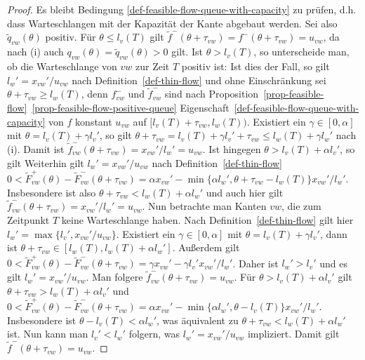 \begin{proof}
	Es bleibt Bedingung \ref{def-feasible-flow-queue-with-capacity} zu prüfen, d.h. dass Warteschlangen mit der Kapazität der Kante abgebaut werden.
	Sei also $\tilde{q}_{vw}(\theta)$ positiv.
	Für $\theta\leq l_v(T)$ gilt $\tilde{f}^-(\theta + \tau_{vw}) = f^-(\theta + \tau_{vw}) = u_{vw}$, da nach (i) auch $q_{vw}(\theta)=\tilde{q}_{vw}(\theta)>0$ gilt.
	Ist $\theta > l_v(T)$, so unterscheide man, ob die Warteschlange von $vw$ zur Zeit $T$ positiv ist:
	Ist dies der Fall, so gilt $l_w' = x_{vw}' / u_{vw}$ nach Definition~\ref{def-thin-flow} und ohne Einschränkung sei $\theta + \tau_{vw} \geq l_w(T)$, denn $f_{vw}^-$ und $\tilde{f}_{vw}^-$ sind nach Proposition~\ref{prop-feasible-flow}~\ref{prop-feasible-flow-positive-queue}  Eigenschaft~\ref{def-feasible-flow-queue-with-capacity} von $f$ konstant $u_{vw}$ auf $[l_v(T)+\tau_{vw},l_w(T))$.
	Existiert ein $\gamma\in [0, \alpha]$ mit $\theta = l_v(T) + \gamma l_v'$, so gilt $\theta + \tau_{vw} = l_v(T) + \gamma l_v' + \tau_{vw} \leq l_w(T) + \gamma l_w'$ nach (i).
	Damit ist $\tilde{f}^-_{vw}(\theta + \tau_{vw}) = x_{vw}'/l_w' = u_{vw}$.
	Ist  hingegen $\theta > l_v(T) + \alpha l_v'$, so gilt
	Weiterhin gilt $l_w' = x_{vw}' / u_{vw}$ nach Definition~\ref{def-thin-flow} $0<\tilde{F}^+_{vw}(\theta) - \tilde{F}_{vw}^-(\theta +\tau_{vw}) = \alpha x_{vw}' - \min \{ \alpha l_w', \theta + \tau_{vw} - l_w(T) \} x_{vw}' / l_w'$. Insbesondere ist also $\theta + \tau_{vw} < l_w(T) + \alpha l_w'$ und auch hier gilt $\tilde{f}^-_{vw}(\theta + \tau_{vw}) = x_{vw}'/l_w' = u_{vw}$.	
	Nun betrachte man Kanten $vw$, die zum Zeitpunkt $T$ keine Warteschlange haben.
	Nach Definition~\ref{def-thin-flow} gilt hier $l_w' = \max \{ l_v', x_{vw}' / u_{vw}  \}$.
	Existiert ein $\gamma\in [0, \alpha]$ mit $\theta = l_v(T) + \gamma l_v'$, dann ist $\theta+\tau_{vw}\in [l_w(T), l_w(T) + \alpha l_w']$.
	Außerdem gilt $0<\tilde{F}_{vw}^+(\theta) - \tilde{F}_{vw}^-(\theta + \tau_{vw})= \gamma x_{vw}' - \gamma l_v' x_{vw}'/l_w'$.
	Daher ist $l_w' > l_v'$ und es gilt $l_w' = x_{vw}'/u_{vw}$.
	Man folgere $\tilde{f}_{vw}^-(\theta + \tau_{vw}) = u_{vw}$.
	Für $\theta > l_v(T) + \alpha l_v'$ gilt $\theta + \tau_{vw} > l_w(T) + \alpha l_v'$ und $0 < \tilde{F}_{vw}^+(\theta) - \tilde{F}_{vw}^-(\theta + \tau_{vw}) = \alpha x_{vw}' - \min \{ \alpha l_w', \theta - l_v(T) \}x_{vw}'/l_w'$.
	Insbesondere ist $\theta - l_v(T) < \alpha l_w'$, was äquivalent zu $\theta + \tau_{vw} < l_w(T) + \alpha l_w'$ ist.
	Nun kann man $l_v' < l_w'$ folgern, was $l_w' = x_{vw}'/u_{vw}$ impliziert.
	Damit gilt $\tilde{f}^-(\theta + \tau_{vw}) = u_{vw}$.


\end{proof}
